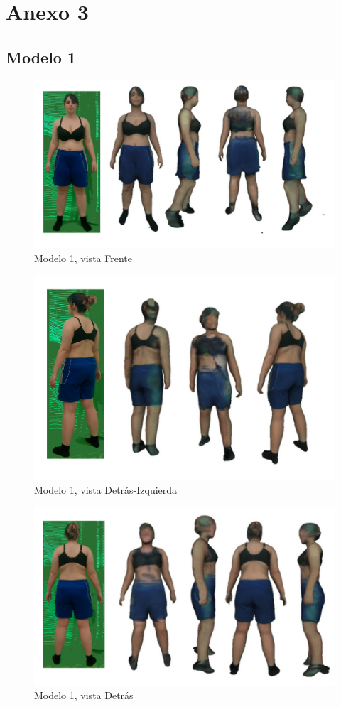 \section{Anexo 3}

\subsection{Modelo 1}
\begin{figure}[H]
	\centering
	\includegraphics[scale=0.65]{imagenes/camelia0.png}
	\caption{Modelo 1, vista Frente}
	\label{fig:c1}
\end{figure}
\begin{figure}[H]
	\centering
	\includegraphics[scale=0.65]{imagenes/camelia5.png}
	\caption{Modelo 1, vista Detrás-Izquierda}
	\label{fig:c2}
\end{figure}
\begin{figure}[H]
	\centering
	\includegraphics[scale=0.65]{imagenes/camelia6.png}
	\caption{Modelo 1, vista Detrás}
	\label{fig:c3}
\end{figure}
